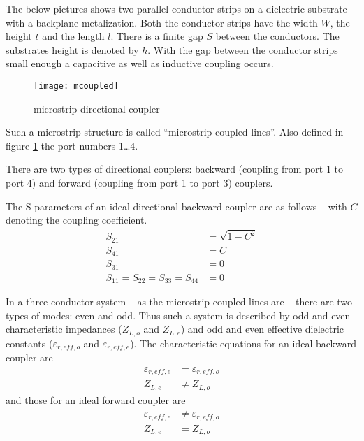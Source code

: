 %
%
%
%


The below pictures shows two parallel conductor strips on a dielectric
substrate with a backplane metalization.  Both the conductor strips
have the width $W$, the height $t$ and the length $l$.  There is a
finite gap $S$ between the conductors.  The substrates height is
denoted by $h$.  With the gap between the conductor strips small
enough a capacitive as well as inductive coupling occurs.

\begin{figure}[ht]
  \centering
  \texttt{[image: mcoupled]}
  \caption{microstrip directional coupler}
  \label{fig:mcoupled}
\end{figure}
\FloatBarrier

Such a microstrip structure is called ``microstrip coupled lines''.
Also defined in figure \ref{fig:mcoupled} the port numbers 1\ldots 4.


There are two types of directional couplers: backward (coupling from
port 1 to port 4) and forward (coupling from port 1 to port 3)
couplers.

\addvspace{12pt}

The S-parameters of an ideal directional backward coupler are as
follows -- with $C$ denoting the coupling coefficient.
\begin{align*}
S_{21} &= \sqrt{1 - C^2}\\
S_{41} &= C\\
S_{31} &= 0\\
S_{11} = S_{22} = S_{33} = S_{44} &= 0
\end{align*}

In a three conductor system -- as the microstrip coupled lines are --
there are two types of modes: even and odd.  Thus such a system is
described by odd and even characteristic impedances ($Z_{L,o}$ and
$Z_{L,e}$) and odd and even effective dielectric constants
($\varepsilon_{r,eff,o}$ and $\varepsilon_{r,eff,e}$).  The
characteristic equations for an ideal backward coupler are
\begin{align*}
\varepsilon_{r,eff,e} &= \varepsilon_{r,eff,o}\\
Z_{L,e} &\ne Z_{L,o}
\end{align*}
and those for an ideal forward coupler are
\begin{align*}
\varepsilon_{r,eff,e} &\ne \varepsilon_{r,eff,o}\\
Z_{L,e} &= Z_{L,o}
\end{align*}

